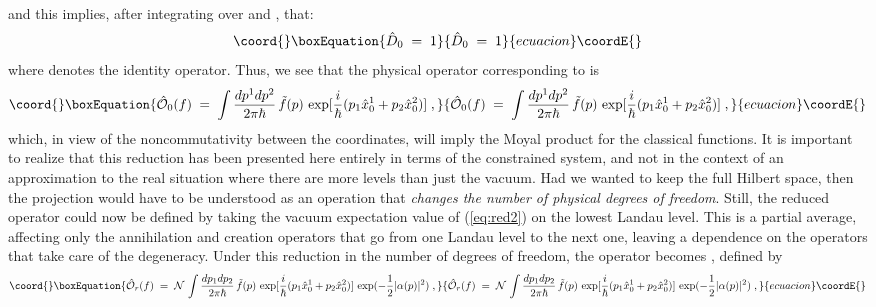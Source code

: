 \documentclass[a4paper,12pt]{article}
\begin{document}
and this implies, after integrating over \myHighlight{$\beta$}\coordHE{} and \myHighlight{$\beta^*$}\coordHE{},
that:
\begin{equation}\coord{}\boxEquation{
  \label{eq:d0}
 {\hat D}_0 \;=\; 1
}{
  {\hat D}_0 \;=\; 1
}{ecuacion}\coordE{}\end{equation}
where \coordHE{} denotes the identity operator. Thus, we see that the
physical operator corresponding to \coordHE{} is
\begin{equation}\coord{}\boxEquation{
  \label{eq:redf}
{\hat{\mathcal O}}_0(f) \;=\; \int \frac{dp^1 dp^2}{2 \pi \hbar} \,
{\tilde f}(p) \, \exp [ \frac{i}{\hbar} (p_1 {\hat x}^1_0 + p_2
{\hat x}^2_0)] 
\;,
}{
  {\hat{\mathcal O}}_0(f) \;=\; \int \frac{dp^1 dp^2}{2 \pi \hbar} \,
{\tilde f}(p) \, \exp [ \frac{i}{\hbar} (p_1 {\hat x}^1_0 + p_2
{\hat x}^2_0)] 
\;,
}{ecuacion}\coordE{}\end{equation}
which, in view of the noncommutativity between the \coordHE{}
coordinates, will imply the Moyal product for the classical
functions.
It is important to realize that this reduction has been presented
here
entirely in terms of the constrained system, and not in the context
of
an approximation to the real situation where there are more levels
than just the vacuum. Had we wanted to keep the full Hilbert space,
then the projection would have to be understood as an operation
that
{\em changes the number of physical degrees of freedom}.  Still,
the
reduced operator could now be defined by taking the vacuum
expectation
value of (\ref{eq:red2}) on the lowest Landau level. This is a
partial
average, affecting only the annihilation and creation operators
that
go from one Landau level to the next one, leaving a dependence on
the
operators that take care of the degeneracy. Under this reduction in
the number of degrees of freedom, the operator \coordHE{} becomes \coordHE{}, defined by
\begin{equation}\coord{}\boxEquation{
  \label{eq:red4}
  {\hat {\mathcal O}}_r(f)\;=\; {\mathcal N}\, \int \frac{dp_1
dp_2}{2\pi \hbar}\,
  {\tilde f}(p) \, \exp [ \frac{i}{\hbar} (p_1 {\hat x}^1_0 + p_2
{\hat x}^2_0)]
  \, \exp (-\frac{1}{2} |\alpha (p)|^2 ) \;,
}{
  {\hat {\mathcal O}}_r(f)\;=\; {\mathcal N}\, \int \frac{dp_1
dp_2}{2\pi \hbar}\,
  {\tilde f}(p) \, \exp [ \frac{i}{\hbar} (p_1 {\hat x}^1_0 + p_2
{\hat x}^2_0)]
  \, \exp (-\frac{1}{2} |\alpha (p)|^2 ) \;,
}{ecuacion}\coordE{}\end{equation}
\end{document}
